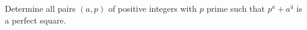Determine all pairs $(a, p)$ of positive integers with $p$ prime such that $p^a + a^4$ is a perfect square.
